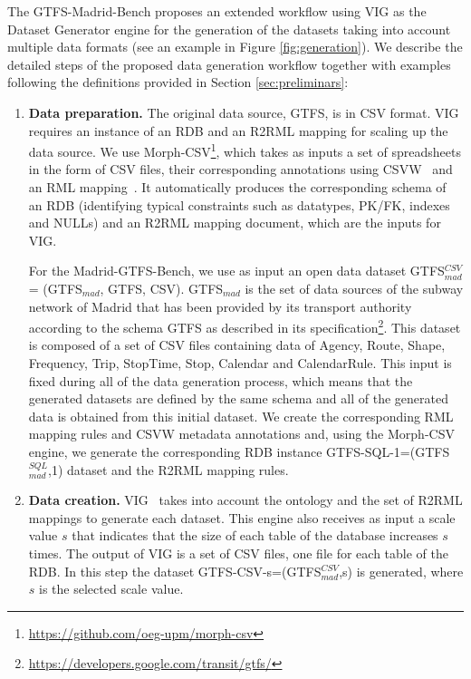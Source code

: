 The GTFS-Madrid-Bench proposes an extended workflow using VIG as the Dataset Generator engine for the generation of the datasets taking into account multiple data formats (see an example in Figure \ref{fig:generation}). We describe the detailed steps of the proposed data generation workflow together with examples following the definitions provided in Section \ref{sec:preliminars}:

\begin{enumerate}[label=\textbf{\arabic*})]
    \item \textbf{Data preparation.} The original data source, GTFS, is in CSV format. VIG requires an instance of an RDB and an R2RML mapping for scaling up the data source. We use Morph-CSV\footnote{\url{https://github.com/oeg-upm/morph-csv}}, which takes as inputs a set of spreadsheets in the form of CSV files, their corresponding annotations using CSVW~\citep{tennison2015model} and an RML mapping~\citep{dimou2014rml}. It automatically produces the corresponding schema of an RDB (identifying typical constraints such as datatypes, PK/FK, indexes and NULLs) and an R2RML mapping document, which are the inputs for VIG. 
    
    For the Madrid-GTFS-Bench, we use as input an open data dataset GTFS$_{mad}^{CSV}$ = (GTFS$_{mad}$, GTFS, CSV). GTFS$_{mad}$ is the set of data sources of the subway network of Madrid that has been provided by its transport authority according to the schema GTFS as described in its specification\footnote{\url{https://developers.google.com/transit/gtfs/}}. This dataset is composed of a set of CSV files containing data of Agency, Route, Shape, Frequency, Trip, StopTime, Stop, Calendar and CalendarRule. This input is fixed during all of the data generation process, which means that the generated datasets are defined by the same schema and all of the generated data is obtained from this initial dataset. We create the corresponding RML mapping rules and CSVW metadata annotations and, using the Morph-CSV engine, we generate the corresponding RDB instance GTFS-SQL-1=(GTFS$_{mad}^{SQL}$,1) dataset and the R2RML mapping rules.
    
    \item \textbf{Data creation.} VIG~\citep{lantivig} takes into account the ontology and the set of R2RML mappings to generate each dataset. This engine also receives as input a scale value $s$ that indicates that the size of each table of the database increases $s$ times. The output of VIG is a set of CSV files, one file for each table of the RDB. In this step the dataset GTFS-CSV-s=(GTFS$_{mad}^{CSV}$,s) is generated, where $s$ is the selected scale value.
    

\end{enumerate}
